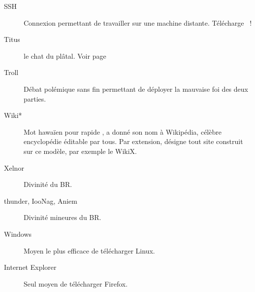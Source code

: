 \begin{description}
  \item[SSH] Connexion permettant de travailler sur une machine distante. Télécharge ~!

  \item[Titus] le chat du plâtal. Voir page \pageref{titus}

  \item[Troll] Débat polémique sans fin permettant de déployer la mauvaise foi des deux parties.



  \item[Wiki*] Mot hawa\"ien pour \og rapide \fg, a donné son nom à Wikipédia, célèbre encyclopédie éditable par tous.
  Par extension, désigne tout site construit sur ce modèle, par exemple le WikiX.%

  \item[Xelnor] Divinité du BR.

  \item[thunder, IooNag, Aniem] Divinité mineures du BR.

  \item[Windows] Moyen le plus efficace de télécharger Linux.

  \item[Internet Explorer] Seul moyen de télécharger Firefox.

\end{description}
